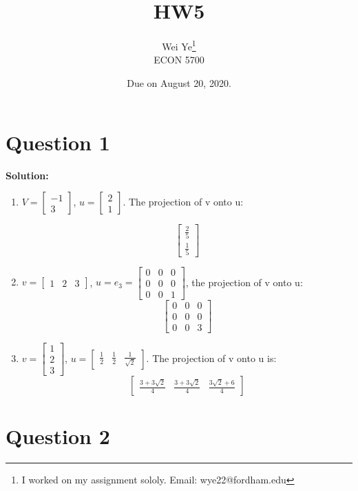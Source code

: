\documentclass[11pt]{article} %
\title{HW5}
\author{Wei Ye\footnote{I worked on my assignment sololy. Email: wye22@fordham.edu}  	\\
	ECON 5700}
\date{Due on August 20, 2020.}
\begin{document}
	\maketitle
	\section{Question 1}
	\textbf{Solution:}
\begin{enumerate}
	\item $V=
	\begin{bmatrix}
		-1\\3
	\end{bmatrix}$, $u=
\begin{bmatrix}
	2\\1
\end{bmatrix}$. The projection of v onto u:

$$\begin{bmatrix}
	\frac{2}{5}\\
	\frac{1}{5}
\end{bmatrix}$$
\item $v=
\begin{bmatrix}
	1&2&3
\end{bmatrix}$, $u=e_3=
\begin{bmatrix}
	0&0&0\\
	0&0&0\\
	0&0&1
\end{bmatrix}$, the projection of v onto u:
$$\begin{bmatrix}
	0&0&0\\
	0&0&0\\
	0&0&3
\end{bmatrix}$$
\item $v=
\begin{bmatrix}
	1\\2\\3
\end{bmatrix}$, $u=
\begin{bmatrix}
	\frac{1}{2}&\frac{1}{2}&\frac{1}{\sqrt{2}}
\end{bmatrix}$. The projection of v onto u is:
$$\begin{bmatrix}
	\frac{3+3\sqrt{2}}{4}& \frac{3+3\sqrt{2}}{4} &\frac{3\sqrt{2}+6}{4}
\end{bmatrix}$$


\end{enumerate}




\section{Question 2}
\end{document}
